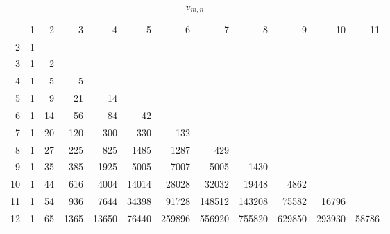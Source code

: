 \documentclass[10pt]{amsart}
\begin{document}
\begin{table}[h]
{\scriptsize \begin{tabular}{|r|rrrrrrrrrrr|} \hline
& 1 & 2 & 3 & 4 & 5 & 6 & 7 & 8 & 9 & 10 & 11 \\
2 & 1 &&&&&&&&&& \\
3 & 1 & 2 &&&&&&&&& \\
4 & 1 & 5 & 5 &&&&&&&& \\
5 & 1 & 9 & 21 & 14 &&&&&&& \\
6 & 1 & 14 & 56 & 84 & 42 &&&&&& \\
7 & 1 & 20 & 120 & 300 & 330 & 132 &&&&& \\
8 & 1 & 27 & 225 & 825 & 1485 & 1287 & 429 &&&& \\
9 & 1 & 35 & 385 & 1925 & 5005 & 7007 & 5005 & 1430 &&& \\
10 & 1 & 44 & 616 & 4004 & 14014 & 28028 & 32032 & 19448 & 4862 && \\
11 & 1 & 54 & 936 & 7644 & 34398 & 91728 & 148512 & 143208 & 75582 & 16796 & \\
12 & 1 & 65 & 1365 & 13650 & 76440 & 259896 & 556920 & 755820 & 629850 & 293930 & 58786 \\ \hline


\end{tabular}}
\vspace{.2cm}
\caption{$v_{m,n}$}
\label{v-mn}
\end{table}
\end{document}
